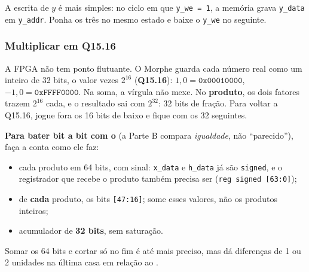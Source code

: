 \documentclass[11pt,a4paper,oneside]{article}
\newcommand{\arq}[1]{{\upshape\ttfamily\detokenize{#1}}}
\begin{document}
A escrita de \(y\) é mais simples: no ciclo em que \texttt{y\_we = 1}, a
memória grava \texttt{y\_data} em \texttt{y\_addr}. Ponha os três no mesmo
estado e baixe o \texttt{y\_we} no seguinte.

\subsubsection*{Multiplicar em Q15.16}

\begin{porque}
A FPGA não tem ponto flutuante. O Morphe guarda cada número real como um
inteiro de 32 bits, o valor vezes \(2^{16}\) (\textbf{Q15.16}): \(1{,}0 =
\texttt{0x00010000}\), \(-1{,}0 = \texttt{0xFFFF0000}\). Na soma, a vírgula
não mexe. No \textbf{produto}, os dois fatores trazem \(2^{16}\) cada, e o
resultado sai com \(2^{32}\): 32 bits de fração. Para voltar a Q15.16, jogue
fora os 16 bits de baixo e fique com os 32 seguintes.
\end{porque}

\begin{center}
\end{center}

\begin{cuidado}
\textbf{Para bater bit a bit com o \arq{conv1d}} (a Parte B compara
\emph{igualdade}, não ``parecido''), faça a conta como ele faz:
\begin{itemize}
  \item cada produto em 64 bits, com sinal: \texttt{x\_data} e
    \texttt{h\_data} já são \texttt{signed}, e o registrador que recebe o
    produto também precisa ser (\texttt{reg signed [63:0]});
  \item de \textbf{cada} produto, os bits \texttt{[47:16]}; some esses
    valores, não os produtos inteiros;
  \item acumulador de \textbf{32 bits}, sem saturação.
\end{itemize}
Somar os 64 bits e cortar só no fim é até mais preciso, mas dá diferenças de
1 ou 2 unidades na última casa em relação ao \arq{conv1d}.
\end{cuidado}
\end{document}
